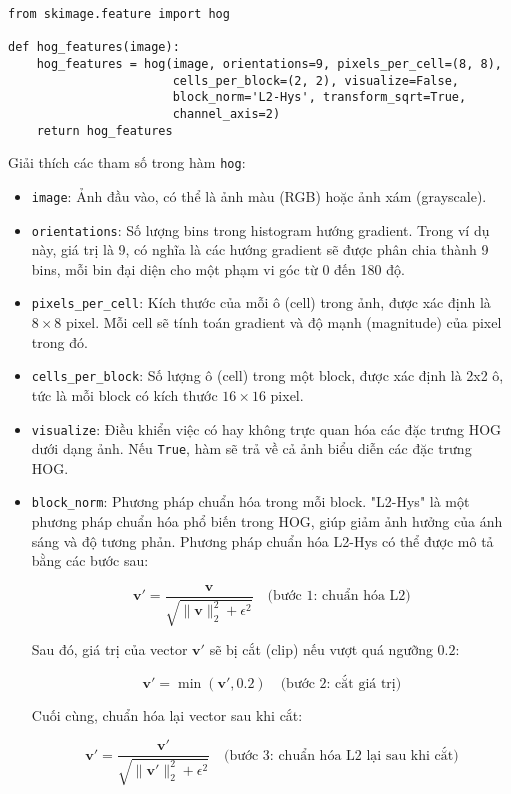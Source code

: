 \documentclass[a4paper,12pt]{article}
\begin{document}
\begin{verbatim}
from skimage.feature import hog

def hog_features(image):
    hog_features = hog(image, orientations=9, pixels_per_cell=(8, 8), 
                       cells_per_block=(2, 2), visualize=False, 
                       block_norm='L2-Hys', transform_sqrt=True, 
                       channel_axis=2)
    return hog_features
\end{verbatim}

\noindent Giải thích các tham số trong hàm \texttt{hog}:
\begin{itemize}
    \item \texttt{image}: Ảnh đầu vào, có thể là ảnh màu (RGB) hoặc ảnh xám (grayscale).
    \item \texttt{orientations}: Số lượng bins trong histogram hướng gradient. Trong ví dụ này, giá trị là 9, có nghĩa là các hướng gradient sẽ được phân chia thành 9 bins, mỗi bin đại diện cho một phạm vi góc từ 0 đến 180 độ.
    \item \texttt{pixels\_per\_cell}: Kích thước của mỗi ô (cell) trong ảnh, được xác định là \(8 \times 8\) pixel. Mỗi cell sẽ tính toán gradient và độ mạnh (magnitude) của pixel trong đó.
    \item \texttt{cells\_per\_block}: Số lượng ô (cell) trong một block, được xác định là 2x2 ô, tức là mỗi block có kích thước \(16 \times 16\) pixel.
    \item \texttt{visualize}: Điều khiển việc có hay không trực quan hóa các đặc trưng HOG dưới dạng ảnh. Nếu \texttt{True}, hàm sẽ trả về cả ảnh biểu diễn các đặc trưng HOG.
    \item \texttt{block\_norm}: Phương pháp chuẩn hóa trong mỗi block. "L2-Hys" là một phương pháp chuẩn hóa phổ biến trong HOG, giúp giảm ảnh hưởng của ánh sáng và độ tương phản. Phương pháp chuẩn hóa L2-Hys \cite{hog_l2_norm} có thể được mô tả bằng các bước sau:

    \[
    \mathbf{v'} = \frac{\mathbf{v}}{\sqrt{\|\mathbf{v}\|_2^2 + \epsilon^2}} \quad \text{(bước 1: chuẩn hóa L2)}
    \]

    Sau đó, giá trị của vector \(\mathbf{v'}\) sẽ bị cắt (clip) nếu vượt quá ngưỡng \(0.2\):

    \[
    \mathbf{v'} = \min(\mathbf{v'}, 0.2) \quad \text{(bước 2: cắt giá trị)}
    \]

    Cuối cùng, chuẩn hóa lại vector sau khi cắt:

    \[
    \mathbf{v'} = \frac{\mathbf{v'}}{\sqrt{\|\mathbf{v'}\|_2^2 + \epsilon^2}} \quad \text{(bước 3: chuẩn hóa L2 lại sau khi cắt)}
    \]


\end{itemize}
\end{document}
